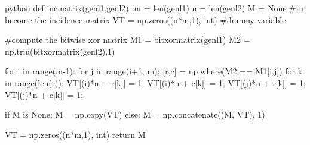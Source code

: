 \documentclass[11pt, parskip=half]{scrartcl}
\begin{document}
\begin{codeblock}{python}
    def incmatrix(genl1,genl2):
    m = len(genl1)
    n = len(genl2)
    M = None #to become the incidence matrix
    VT = np.zeros((n*m,1), int)  #dummy variable
    
    #compute the bitwise xor matrix
    M1 = bitxormatrix(genl1)
    M2 = np.triu(bitxormatrix(genl2),1) 

    for i in range(m-1):
        for j in range(i+1, m):
            [r,c] = np.where(M2 == M1[i,j])
            for k in range(len(r)):
                VT[(i)*n + r[k]] = 1;
                VT[(i)*n + c[k]] = 1;
                VT[(j)*n + r[k]] = 1;
                VT[(j)*n + c[k]] = 1;
                
                if M is None:
                    M = np.copy(VT)
                else:
                    M = np.concatenate((M, VT), 1)
                
                VT = np.zeros((n*m,1), int)
    return M
\end{codeblock}
\end{document}
